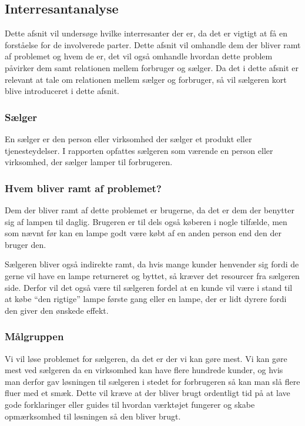 \subsection{Interresantanalyse}

 Dette afsnit vil undersøge hvilke interresanter der er, da det er vigtigt at få en forståelse for de involverede parter. Dette afsnit vil omhandle dem der bliver ramt af problemet og hvem de er, det vil også omhandle hvordan dette problem påvirker dem samt relationen mellem forbruger og sælger. Da det i dette afsnit er relevant at tale om relationen mellem sælger og forbruger, så vil sælgeren kort blive introduceret i dette afsnit.

 \subsubsection{Sælger}
En sælger er den person eller virksomhed der sælger et produkt eller tjenesteydelser. I rapporten opfattes sælgeren som værende en person eller virksomhed, der sælger lamper til forbrugeren. 

\subsubsection{Hvem bliver ramt af problemet?}
Dem der bliver ramt af dette problemet er brugerne, da det er dem der benytter sig af lampen til daglig. Brugeren er til dels også køberen i nogle tilfælde, men som nævnt før kan en lampe godt være købt af en anden person end den der bruger den.

Sælgeren bliver også indirekte ramt, da hvis mange kunder henvender sig fordi de gerne vil have en lampe returneret og byttet, så kræver det resourcer fra sælgeren side. Derfor vil det også være til sælgeren fordel at en kunde vil være i stand til at købe “den rigtige” lampe første gang eller en lampe, der er lidt dyrere fordi den giver den ønskede effekt.
 
\subsubsection{Målgruppen}
Vi vil løse problemet for sælgeren, da det er der vi kan gøre mest. Vi kan gøre mest ved sælgeren da en virksomhed kan have flere hundrede kunder, og hvis man derfor gav løsningen til sælgeren i stedet for forbrugeren så kan man slå flere fluer med et smæk. Dette vil kræve at der bliver brugt ordentligt tid på at lave gode forklaringer eller guides til hvordan værktøjet fungerer og skabe opmærksomhed til løsningen så den bliver brugt.
 
